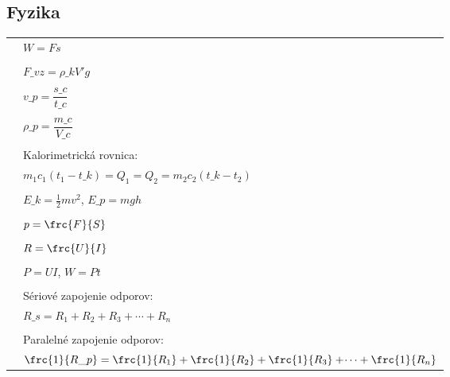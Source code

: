 \documentclass[vyfuk,\classoptions]{fksgeneric}
\begin{document}
\newpage
\subsection{Fyzika}

\begin{framed}
\begin{multicols}{2}
\begin{center}
\begin{tabular}{ r l}
 & $W = Fs$ \\ \\
 & $F\_{vz} = \rho\_k V' g$\\ \\
 & $v\_p = \dfrac{s\_{c}}{t\_{c}}$ \\ \\
 & $\rho\_p = \dfrac{m\_c}{V\_c}$ \\ \\
 & Kalorimetrická rovnica:\\
 & $m_1 c_1 (t_1 - t\_k) = Q_1 = Q_2 = m_2 c_2 (t\_k - t_2)$ \\ \\
 & $E\_{k} = \frac{1}{2} m v^{2}$, \qquad $E\_{p} = m g h$\\ \\
 & $p = \frc{F}{S}$ \\ \\
 & $R = \frc{U}{I}$ \\ \\
 & $P = UI$, \qquad $W = Pt$ \\ \\
 & Sériové zapojenie odporov:\\
 & $R\_{s} = R_{1} + R_{2} + R_{3} + \dotsi + R_{n}$ \\ \\
 & Paralelné zapojenie odporov:\\
 & $\frc{1}{R\_{p}} = \frc{1}{R_{1}} + \frc{1}{R_{2}} + \frc{1}{R_{3}} + \dotsi + \frc{1}{R_{n}}$
\end{tabular}
\end{center}


\columnbreak


\end{multicols}
\end{framed}
\end{document}
